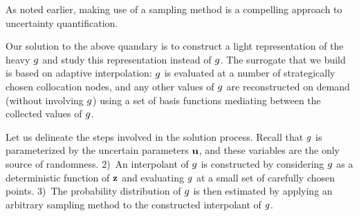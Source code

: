 As noted earlier, making use of a sampling method is a compelling approach to
uncertainty quantification. 

Our solution to the above quandary is to construct a light representation of the
heavy $g$ and study this representation instead of $g$. The surrogate that we
build is based on adaptive interpolation: $g$ is evaluated at a number of
strategically chosen collocation nodes, and any other values of $g$ are
reconstructed on demand (without involving $g$) using a set of basis functions
mediating between the collected values of $g$. 

Let us delineate the steps involved in the solution process. Recall that $g$ is
parameterized by the uncertain parameters $\mathbf{u}$, and these variables are the
only source of randomness.  2)~An interpolant of $g$ is constructed
by considering $g$ as a deterministic function of $\mathbf{z}$ and evaluating $g$ at
a small set of carefully chosen points. 3)~The probability distribution of $g$
is then estimated by applying an arbitrary sampling method to the constructed
interpolant of $g$.

